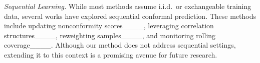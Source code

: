 \medskip

\noindent\emph{Sequential Learning.} While most methods assume i.i.d.\ or exchangeable training data, several works have explored sequential conformal prediction. These methods include updating nonconformity scores____, leveraging correlation structures____, reweighting samples____, and monitoring rolling coverage____. Although our method does not address sequential settings, extending it to this context is a promising avenue for future research.





